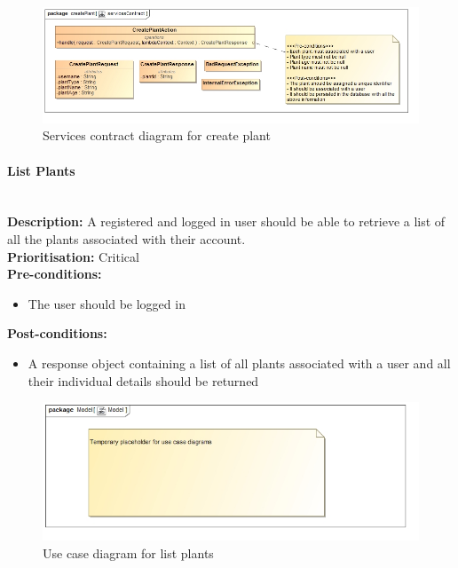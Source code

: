 \documentclass{article}
\begin{document}
		\begin{figure}[H]
			\includegraphics[width=\linewidth]{images/ServicesContracts/createPlant.jpg}
			\caption{Services contract diagram for create plant}
		\end{figure}
		
	\paragraph{List Plants}\mbox{}\\
		\textbf{Description:} A registered and logged in user should be able to retrieve a list of all the plants associated with their account.\\
		\textbf{Prioritisation:} Critical\\		
		\textbf{Pre-conditions:}
			\begin{itemize}
				\item The user should be logged in
			\end{itemize}
		\textbf{Post-conditions:}
			\begin{itemize}
				\item A response object containing a list of all plants associated with a user and all their individual details should be returned
			\end{itemize}

		\begin{figure}[H]
			\includegraphics[width=\linewidth]{images/tempUseCase.jpg}
			\caption{Use case diagram for list plants}
		\end{figure}
		
\end{document}
